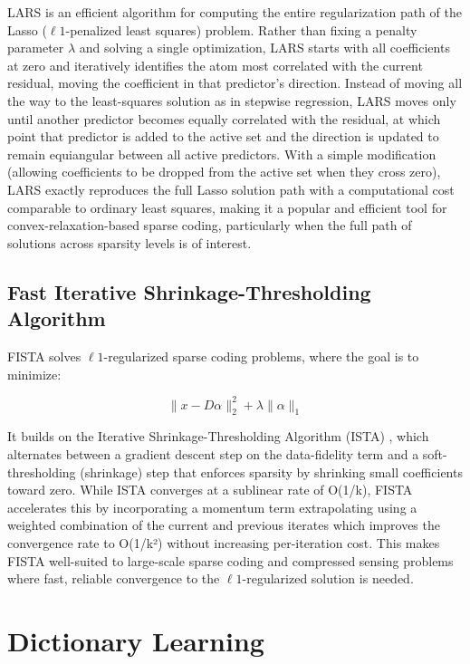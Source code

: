 LARS \citep{efron2004lars} is an efficient algorithm for computing the entire regularization path of the Lasso ($\ell1$-penalized least squares) problem.
Rather than fixing a penalty parameter $\lambda$ and solving a single optimization, LARS starts with all coefficients at zero and
iteratively identifies the atom most correlated with the current residual, moving the coefficient in that predictor's
direction. Instead of moving all the way to the least-squares solution as in stepwise regression, LARS moves only until another
predictor becomes equally correlated with the residual, at which point that predictor is added to the active set and the direction
is updated to remain equiangular between all active predictors. With a simple modification (allowing coefficients to be dropped
from the active set when they cross zero), LARS exactly reproduces the full Lasso solution path with a computational cost
comparable to ordinary least squares, making it a popular and efficient tool for convex-relaxation-based sparse coding,
particularly when the full path of solutions across sparsity levels is of interest.

\subsection{Fast Iterative Shrinkage-Thresholding Algorithm}

FISTA \citep{beck2009fista} solves $\ell1$-regularized sparse coding problems, where the goal is to minimize:

\begin{equation}[FISTA Objective]
\|x - D\alpha\|_2^2 + \lambda\|\alpha\|_1
\end{equation}

It builds on the Iterative Shrinkage-Thresholding Algorithm (ISTA) \citep{daubechies2004ista}, which alternates between a gradient descent step on the
data-fidelity term and a soft-thresholding (shrinkage) step that enforces sparsity by shrinking small coefficients toward zero.
While ISTA converges at a sublinear rate of O(1/k), FISTA accelerates this by incorporating a momentum term extrapolating using
a weighted combination of the current and previous iterates which improves the convergence rate to O(1/k²) without increasing
per-iteration cost. This makes FISTA well-suited to large-scale sparse coding and compressed sensing problems where fast,
reliable convergence to the $\ell1$-regularized solution is needed.

\section{Dictionary Learning}

